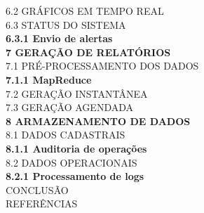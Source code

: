   6.2 GRÁFICOS EM TEMPO REAL \\
  6.3 STATUS DO SISTEMA \\
  \textbf{6.3.1 Envio de alertas} \\
  \textbf{7 GERAÇÃO DE RELATÓRIOS} \\
  7.1 PRÉ-PROCESSAMENTO DOS DADOS \\
  \textbf{7.1.1 MapReduce} \\
  7.2 GERAÇÃO INSTANTÂNEA \\
  7.3 GERAÇÃO AGENDADA \\
  \textbf{8 ARMAZENAMENTO DE DADOS} \\
  8.1 DADOS CADASTRAIS \\
  \textbf{8.1.1 Auditoria de operações} \\
  8.2 DADOS OPERACIONAIS \\
  \textbf{8.2.1 Processamento de logs} \\
  CONCLUSÃO \\
  REFERÊNCIAS \\
